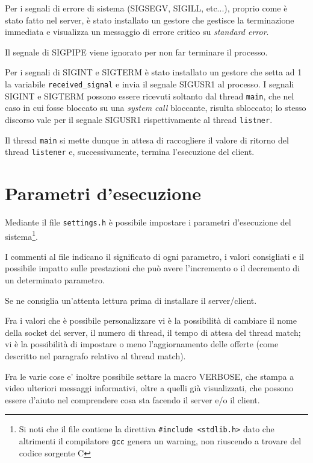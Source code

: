 \documentclass[a4paper,10pt]{article}
\begin{document}
Per i segnali di errore di sistema (SIGSEGV, SIGILL, etc...), proprio come \`e stato fatto nel server, \`e stato installato un gestore che gestisce la terminazione immediata e visualizza un messaggio di errore critico su \textit{standard error}.

Il segnale di SIGPIPE viene ignorato per non far terminare il processo.

Per i segnali di SIGINT e SIGTERM \`e stato installato un gestore che setta ad 1 la variabile \texttt{received\_signal} e invia il segnale SIGUSR1 al processo.
I segnali SIGINT e SIGTERM possono essere ricevuti soltanto dal thread \texttt{main}, che nel caso in cui fosse bloccato su una \textit{system call} bloccante, risulta sbloccato; lo stesso discorso vale per il segnale SIGUSR1 rispettivamente al thread \texttt{listner}.

Il thread \texttt{main} si mette dunque in attesa di raccogliere il valore di ritorno del thread \texttt{listener} e, successivamente, termina l'esecuzione del client.

\section{Parametri d'esecuzione}

Mediante il file \texttt{settings.h} \`e possibile impostare i parametri d'esecuzione del sistema\footnote{Si noti che il file contiene la direttiva \texttt{\#include <stdlib.h>} dato che altrimenti il compilatore \texttt{gcc} genera un warning, non riuscendo a trovare del codice sorgente C}.

I commenti al file indicano il significato di ogni parametro, i valori consigliati e il possibile impatto sulle prestazioni che pu\`o avere l'incremento o il decremento di un determinato parametro.

Se ne consiglia un'attenta lettura prima di installare il server/client.

Fra i valori che \`e possibile personalizzare vi \`e la possibilit\`a di cambiare il nome della socket del server, il numero di thread, il tempo di attesa del thread match; vi \`e la possibilit\`a di impostare o meno l'aggiornamento delle offerte (come descritto nel paragrafo relativo al thread match).

Fra le varie cose e' inoltre possibile settare la macro VERBOSE, che stampa a video ulteriori messaggi informativi, oltre a quelli gi\`a visualizzati, che possono essere d'aiuto nel comprendere cosa sta facendo il server e/o il client.
\end{document}
